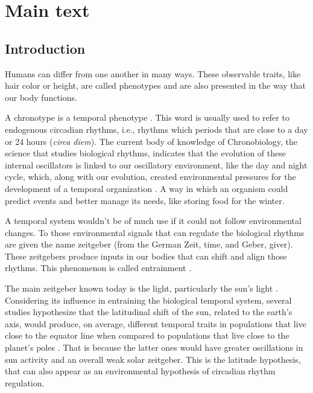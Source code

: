 \documentclass[
12pt,
openright,
oneside,
a4paper,
chapter=TITLE,
section=TITLE,
french,
spanish,
brazil,
english
]{abntex2}\usepackage{array}
\begin{document}
\section{Main text}\label{main-text}

\subsection{Introduction}\label{introduction-1}

Humans can differ from one another in many ways. These observable
traits, like hair color or height, are called phenotypes and are also
presented in the way that our body functions.

A chronotype is a temporal phenotype
\autocite{ehret1974,pittendrigh1993}. This word is usually used to refer
to endogenous circadian rhythms, i.e., rhythms which periods that are
close to a day or 24 hours (\emph{circa diem}). The current body of
knowledge of Chronobiology, the science that studies biological rhythms,
indicates that the evolution of these internal oscillators is linked to
our oscillatory environment, like the day and night cycle, which, along
with our evolution, created environmental pressures for the development
of a temporal organization \autocite{aschoff1989,paranjpe2005}. A way in
which an organism could predict events and better manage its needs, like
storing food for the winter.

A temporal system wouldn't be of much use if it could not follow
environmental changes. To those environmental signals that can regulate
the biological rhythms are given the name zeitgeber (from the German
Zeit, time, and Geber, giver). These zeitgebers produce inputs in our
bodies that can shift and align those rhythms. This phenomenon is called
entrainment \autocite{roenneberg2003a,roenneberg2010}.

The main zeitgeber known today is the light, particularly the sun's
light \autocite{khalsa2003,minors1991,roenneberg2007a}. Considering its
influence in entraining the biological temporal system, several studies
hypothesize that the latitudinal shift of the sun, related to the
earth's axis, would produce, on average, different temporal traits in
populations that live close to the equator line when compared to
populations that live close to the planet's poles
\autocite{horzum2015,hut2013,leocadio-miguel2017,leocadio-miguel2014,pittendrigh1991,randler2017}.
That is because the latter ones would have greater oscillations in sun
activity and an overall weak solar zeitgeber. This is the latitude
hypothesis, that can also appear as an environmental hypothesis of
circadian rhythm regulation.
\end{document}
